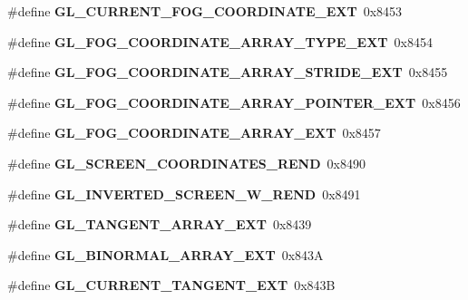 \begin{DoxyCompactItemize}
\item 
\#define {\bfseries G\+L\+\_\+\+C\+U\+R\+R\+E\+N\+T\+\_\+\+F\+O\+G\+\_\+\+C\+O\+O\+R\+D\+I\+N\+A\+T\+E\+\_\+\+E\+X\+T}~0x8453\label{_s_d_l__opengl_8h_aec4ad8b73b9126761d914bdae26936c3}

\item 
\#define {\bfseries G\+L\+\_\+\+F\+O\+G\+\_\+\+C\+O\+O\+R\+D\+I\+N\+A\+T\+E\+\_\+\+A\+R\+R\+A\+Y\+\_\+\+T\+Y\+P\+E\+\_\+\+E\+X\+T}~0x8454\label{_s_d_l__opengl_8h_af7be21f6f2b732aef5a27b54280124e3}

\item 
\#define {\bfseries G\+L\+\_\+\+F\+O\+G\+\_\+\+C\+O\+O\+R\+D\+I\+N\+A\+T\+E\+\_\+\+A\+R\+R\+A\+Y\+\_\+\+S\+T\+R\+I\+D\+E\+\_\+\+E\+X\+T}~0x8455\label{_s_d_l__opengl_8h_a251ffcba70e0ca7f6c4518cb11e14414}

\item 
\#define {\bfseries G\+L\+\_\+\+F\+O\+G\+\_\+\+C\+O\+O\+R\+D\+I\+N\+A\+T\+E\+\_\+\+A\+R\+R\+A\+Y\+\_\+\+P\+O\+I\+N\+T\+E\+R\+\_\+\+E\+X\+T}~0x8456\label{_s_d_l__opengl_8h_aa2f222ef5ca994fa97382523b44bb0cf}

\item 
\#define {\bfseries G\+L\+\_\+\+F\+O\+G\+\_\+\+C\+O\+O\+R\+D\+I\+N\+A\+T\+E\+\_\+\+A\+R\+R\+A\+Y\+\_\+\+E\+X\+T}~0x8457\label{_s_d_l__opengl_8h_af219b279d47a5b5dca276c6de0fa74f4}

\item 
\#define {\bfseries G\+L\+\_\+\+S\+C\+R\+E\+E\+N\+\_\+\+C\+O\+O\+R\+D\+I\+N\+A\+T\+E\+S\+\_\+\+R\+E\+N\+D}~0x8490\label{_s_d_l__opengl_8h_afbf3228e066bf5797559a030706d33a9}

\item 
\#define {\bfseries G\+L\+\_\+\+I\+N\+V\+E\+R\+T\+E\+D\+\_\+\+S\+C\+R\+E\+E\+N\+\_\+\+W\+\_\+\+R\+E\+N\+D}~0x8491\label{_s_d_l__opengl_8h_a137115c12d62f2f15ef3000d644b396e}

\item 
\#define {\bfseries G\+L\+\_\+\+T\+A\+N\+G\+E\+N\+T\+\_\+\+A\+R\+R\+A\+Y\+\_\+\+E\+X\+T}~0x8439\label{_s_d_l__opengl_8h_a5b703106e8d58e7020e52640b96e6823}

\item 
\#define {\bfseries G\+L\+\_\+\+B\+I\+N\+O\+R\+M\+A\+L\+\_\+\+A\+R\+R\+A\+Y\+\_\+\+E\+X\+T}~0x843\+A\label{_s_d_l__opengl_8h_a5f68c471aa9e4c4f772a8cf6c0951ff5}

\item 
\#define {\bfseries G\+L\+\_\+\+C\+U\+R\+R\+E\+N\+T\+\_\+\+T\+A\+N\+G\+E\+N\+T\+\_\+\+E\+X\+T}~0x843\+B\label{_s_d_l__opengl_8h_a656b03f364e361640b853e602c561dc2}


\end{DoxyCompactItemize}

